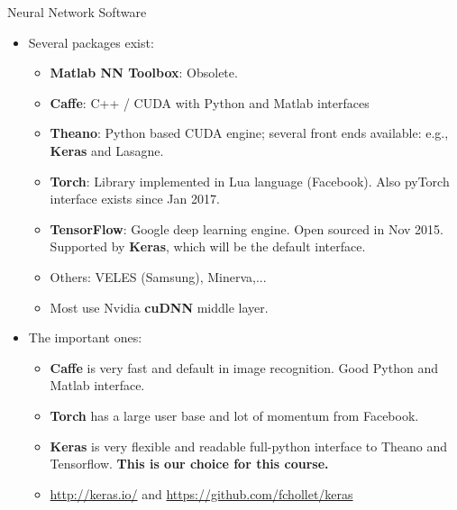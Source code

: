 \documentclass[10pt, aspectratio=169]{beamer} %
\begin{document}
\begin{frame}{Neural Network Software}
	\begin{itemize}
\item Several packages exist:
\begin{itemize}
\item \textbf{Matlab NN Toolbox}: Obsolete. 
	\item \textbf{Caffe}: C++ / CUDA with Python and Matlab interfaces
\item \textbf{Theano}: Python based CUDA engine; several front ends available: e.g., \textbf{Keras} and Lasagne.
\item \textbf{Torch}: Library implemented in Lua language (Facebook). Also pyTorch interface exists since Jan 2017.
\item \textbf{TensorFlow}: Google deep learning engine. Open sourced in Nov 2015. Supported by \textbf{Keras}, which will be the default interface.
\item Others: VELES (Samsung), Minerva,...
\item Most use Nvidia \textbf{cuDNN} middle layer.
\end{itemize}
\item The important ones:
\begin{itemize}
\item \textbf{Caffe} is very fast and default in image recognition. Good Python and Matlab interface.
\item \textbf{Torch} has a large user base and lot of momentum from Facebook.
\item \textbf{Keras} is very flexible and readable full-python interface to Theano and Tensorflow.	\textbf{This is our choice for this course.}
\item \url{http://keras.io/} and \url{https://github.com/fchollet/keras}
\end{itemize}
\end{itemize}
\end{frame}
\end{document}
